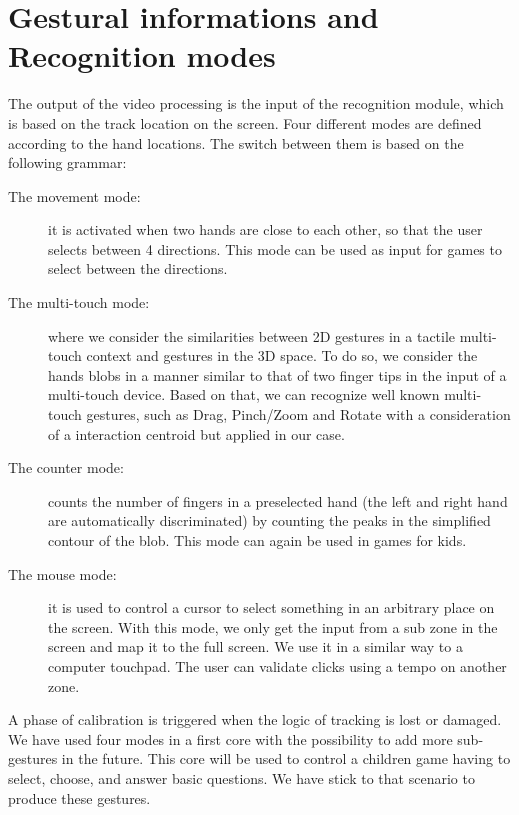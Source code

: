 \documentclass{llncs}
\begin{document}
\section{Gestural informations and Recognition modes}
The output of the video processing is the input of the recognition module,
which is based on the track location on the screen.
Four different modes are defined according to the hand locations. The switch between them is based on the following grammar:
\begin{description}
 \item[The movement mode:] it is activated when two hands are close to each other, so that the user selects between 4 directions. This mode can be used as input for games to select between the directions.
 \item[The multi-touch mode:] where we consider the similarities between 2D gestures in a tactile multi-touch context and gestures in the 3D space. To do so, we consider the hands blobs in a manner similar to that of two finger tips in the input of a multi-touch device. Based on that, we can recognize well known multi-touch gestures, such as Drag, Pinch/Zoom and Rotate with a consideration of a interaction centroid\cite{CentroidGest} but applied in our case.
 \item[The counter mode:] counts the number of fingers in a preselected hand (the left and right hand are automatically discriminated) by counting the peaks in the simplified contour of the blob. This mode can again be used in games for kids.
 \item[The mouse mode:] it is used to control a cursor to select something in an arbitrary place on the screen. With this mode, we only get the input from a sub zone in the screen and map it to the full screen. We use it in a similar way to a computer touchpad.
The user can validate clicks using a tempo on another zone.
\end{description}

A phase of calibration is triggered when the logic of tracking is lost or damaged.
We have used four modes in a first core with the possibility to add more sub-gestures in the future.
This core will be used to control a children game having to select, choose, and answer basic questions.
We have stick to that scenario to produce these gestures. 

\end{document}
